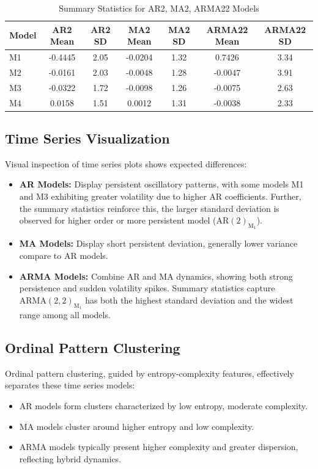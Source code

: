 \documentclass[12pt,a4paper]{article}
\begin{document}
\begin{table}[H]
	\centering
	\caption{Summary Statistics for AR2, MA2, ARMA22 Models}
	\begin{tabular}{lcccccc}
		\toprule
		Model & AR2 Mean & AR2 SD & MA2 Mean & MA2 SD & ARMA22 Mean & ARMA22 SD \\
		\midrule
		M1    & -0.4445  & 2.05   & -0.0204  & 1.32   & 0.7426      & 3.34      \\
		M2    & -0.0161  & 2.03   & -0.0048  & 1.28   & -0.0047     & 3.91      \\
		M3    & -0.0322  & 1.72   & -0.0098  & 1.26   & -0.0075     & 2.63      \\
		M4    & 0.0158   & 1.51   & 0.0012   & 1.31   & -0.0038     & 2.33      \\
		\bottomrule
	\end{tabular}
\end{table}

\subsection{Time Series Visualization}
Visual inspection of time series plots shows expected differences:
\begin{itemize}
	\item \textbf{AR Models:} Display persistent oscillatory patterns, with some models M1 and M3 exhibiting greater volatility due to higher AR coefficients. Further, the summary statistics reinforce this, the larger standard deviation is observed for higher order or more persistent model ($\mathrm{AR}(2)_{\textrm{M}_1}$).  
	\item \textbf{MA Models:} Display short persistent deviation, generally lower variance compare to AR models.
	\item \textbf{ARMA Models:} Combine AR and MA dynamics, showing both strong persistence and sudden volatility spikes. Summary statistics capture $\mathrm{ARMA}(2,2)_{\textrm{M}_1}$ has both the highest standard deviation and the widest range among all models.  
\end{itemize}

\subsection{Ordinal Pattern Clustering}
Ordinal pattern clustering, guided by entropy-complexity features, effectively separates these time series models:
\begin{itemize}
	\item AR models form clusters characterized by low entropy, moderate complexity.
	\item MA models cluster around higher entropy and low complexity.
	\item ARMA models typically present higher complexity and greater dispersion, reflecting hybrid dynamics.
\end{itemize}
\end{document}
